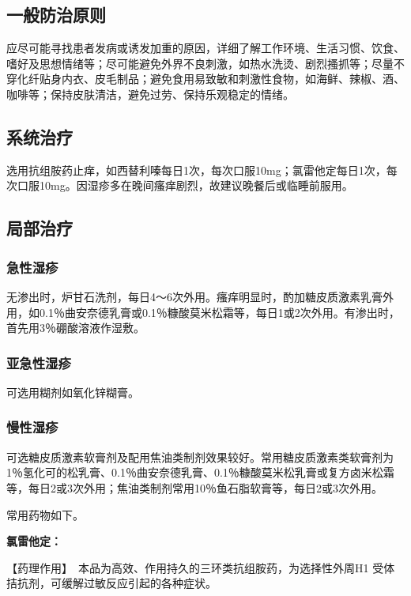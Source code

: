 \subsection{一般防治原则}

应尽可能寻找患者发病或诱发加重的原因，详细了解工作环境、生活习惯、饮食、嗜好及思想情绪等；尽可能避免外界不良刺激，如热水洗烫、剧烈搔抓等；尽量不穿化纤贴身内衣、皮毛制品；避免食用易致敏和刺激性食物，如海鲜、辣椒、酒、咖啡等；保持皮肤清洁，避免过劳、保持乐观稳定的情绪。

\subsection{系统治疗}

选用抗组胺药止痒，如西替利嗪每日1次，每次口服10mg；氯雷他定每日1次，每次口服10mg。因湿疹多在晚间瘙痒剧烈，故建议晚餐后或临睡前服用。

\subsection{局部治疗}

\subsubsection{急性湿疹}

无渗出时，炉甘石洗剂，每日4～6次外用。瘙痒明显时，酌加糖皮质激素乳膏外用，如0.1％曲安奈德乳膏或0.1％糠酸莫米松霜等，每日1或2次外用。有渗出时，首先用3％硼酸溶液作湿敷。

\subsubsection{亚急性湿疹}

可选用糊剂如氧化锌糊膏。

\subsubsection{慢性湿疹}

可选糖皮质激素软膏剂及配用焦油类制剂效果较好。常用糖皮质激素类软膏剂为1％氢化可的松乳膏、0.1％曲安奈德乳膏、0.1％糠酸莫米松乳膏或复方卤米松霜等，每日2或3次外用；焦油类制剂常用10％鱼石脂软膏等，每日2或3次外用。

常用药物如下。

\textbf{氯雷他定：}

【药理作用】　本品为高效、作用持久的三环类抗组胺药，为选择性外周H{1}
受体拮抗剂，可缓解过敏反应引起的各种症状。

